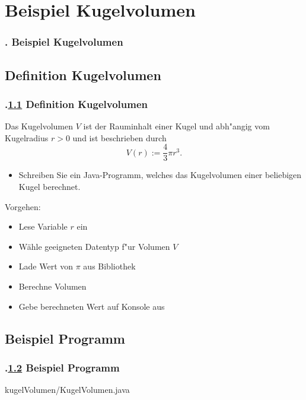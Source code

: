 \AtBeginSection{}
\section{Beispiel Kugelvolumen}
\begin{frame}
  \frametitle{\kap. Beispiel Kugelvolumen}%
\tableofcontents[current]
\end{frame}


\def\stitle{Definition Kugelvolumen}%
\subsection{\stitle}\label{S:Beispiel Kugelvolumen}
\begin{frame}[t]%
  \frametitle{\kap.\ref{S:Beispiel Kugelvolumen} \stitle}%
\medskip

Das Kugelvolumen $V$ ist der Rauminhalt einer Kugel und abh"angig vom Kugelradius $r>0$ und ist beschrieben durch
$$ V(r) := \frac{4}{3} \pi r^3. $$
\begin{itemize}
  \item Schreiben Sie ein Java-Programm, welches das Kugelvolumen einer beliebigen Kugel berechnet.
\end{itemize}
\medskip

Vorgehen:
\begin{itemize}
\item Lese Variable $r$ ein
\item W\"ahle geeigneten Datentyp f"ur Volumen $V$
\item Lade Wert von $\pi$ aus Bibliothek
\item Berechne Volumen
\item Gebe berechneten Wert auf Konsole aus
\end{itemize}
\end{frame}


\def\stitle{Beispiel Programm}%
\subsection{\stitle}\label{S:Beispiel Programm}
\begin{frame}[t]%
  \frametitle{\kap.\ref{S:Beispiel Programm} \stitle}%
\medskip


{kugelVolumen/KugelVolumen.java}
\end{frame}



